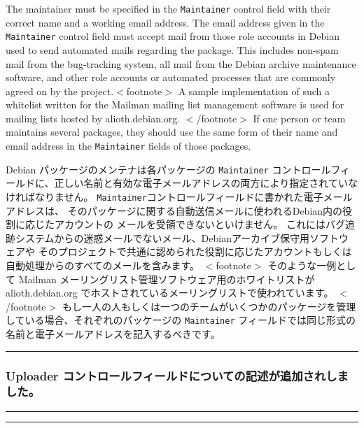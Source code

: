 \documentclass[mingoth,a4paper]{jsarticle}
\begin{document}
\par
\parbox[t]{0.48\linewidth}{
	  The maintainer must be specified in the {\tt Maintainer}
	  control field with their correct name and a working email
	  address.  The email address given in the {\tt Maintainer}
	  control field must accept mail from those role accounts in
	  Debian used to send automated mails regarding the package.  This
	  includes non-spam mail from the bug-tracking system, all mail
	  from the Debian archive maintenance software, and other role
	  accounts or automated processes that are commonly agreed on by
	  the project.$<$footnote$>$
	    A sample implementation of such a whitelist written for the
	    Mailman mailing list management software is used for mailing
	    lists hosted by alioth.debian.org.
	  $<$/footnote$>$
	  If one person or team maintains several packages, they should
	  use the same form of their name and email address in
	  the {\tt Maintainer} fields of those packages.
}\hfil 
\parbox[t]{0.48\linewidth}{
	    Debian パッケージのメンテナは各パッケージの {\tt Maintainer}
	    コントロールフィールドに、正しい名前と有効な電子メールアドレスの両方により指定されていなければなりません。
	    {\tt Maintainer}コントロールフィールドに書かれた電子メールアドレスは、
	    そのパッケージに関する自動送信メールに使われるDebian内の役割に応じたアカウントの
	    メールを受領できないといけません。
	    これにはバグ追跡システムからの迷惑メールでないメール、Debianアーカイブ保守用ソフトウェアや
	    そのプロジェクトで共通に認められた役割に応じたアカウントもしくは自動処理からのすべてのメールを含みます。
	    $<$footnote$>$
		そのような一例として Mailman メーリングリスト管理ソフトウェア用のホワイトリストが
	      alioth.debian.org でホストされているメーリングリストで使われています。
	    $<$/footnote$>$
	    もし一人の人もしくは一つのチームがいくつかのパッケージを管理している場合、それぞれのパッケージの
	    {\tt Maintainer} フィールドでは同じ形式の名前と電子メールアドレスを記入するべきです。
}
\hrule
\vspace{1ex}

\clearpage

\subsubsection{Uploader コントロールフィールドについての記述が追加されしました。}

\vspace{1ex}
\hrule
{}\par
\parbox[t]{0.48\linewidth}{
}\hfil 
\parbox[t]{0.48\linewidth}{
}
\hrule
\end{document}
